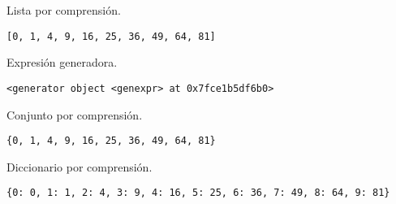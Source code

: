 \begin{code} Lista por comprensión.
\begin{Shaded}
\begin{Highlighting}[]
\NormalTok{[x}\OperatorTok{*} \NormalTok{(}\NormalTok{)]}
\end{Highlighting}
\end{Shaded}

\begin{verbatim}
[0, 1, 4, 9, 16, 25, 36, 49, 64, 81]

\end{verbatim}
\end{code}

\begin{code} Expresión generadora.
\begin{Shaded}
\begin{Highlighting}[]
\OperatorTok{*} \NormalTok{(}\NormalTok{))}
\end{Highlighting}
\end{Shaded}

\begin{verbatim}
<generator object <genexpr> at 0x7fce1b5df6b0>

\end{verbatim}
\end{code}

\begin{code} Conjunto por comprensión.
\begin{Shaded}
\begin{Highlighting}[]
\OperatorTok{*} \NormalTok{(}\NormalTok{)\}}
\end{Highlighting}
\end{Shaded}

\begin{verbatim}
{0, 1, 4, 9, 16, 25, 36, 49, 64, 81}

\end{verbatim}
\end{code}

\begin{code} Diccionario por comprensión.
\begin{Shaded}
\begin{Highlighting}[]
\OperatorTok{*} \NormalTok{(}\NormalTok{)\}}
\end{Highlighting}
\end{Shaded}

\begin{verbatim}
{0: 0, 1: 1, 2: 4, 3: 9, 4: 16, 5: 25, 6: 36, 7: 49, 8: 64, 9: 81}
\end{verbatim}
\end{code}

